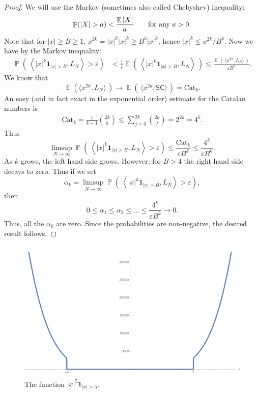\documentclass[letterpaper,11pt,oneside,reqno]{amsart}
\numberwithin{equation}{section}
\newcommand{\SC}{\mathsf{SC}}
\DeclareMathOperator{\EE}{\mathbb{E}}
\DeclareMathOperator{\PP}{\mathbb{P}}
\theoremstyle{definition}
\begin{document}
\begin{proof}
	We will use the Markov (sometimes also called Chebyshev) inequality:
	\begin{equation*}
	\PP (  | X | > a ) < \frac{ \EE | X |  }{ a }\qquad \textnormal{for any $a>0$}.
	\end{equation*}
	Note that for $ | x | \ge B \ge 1 $,
	$x^{2k}=|x|^{k}|x|^{k}\ge B^{k}|x|^{k}$, hence
	$ | x |^k \le x^{ 2 k } / B^k $.  Now we have by the Markov inequality:
	\begin{align*}
	\PP \left( \, \left \langle | x |^k \mathbf{1}_{ | x | > B } , L_N \right \rangle > \varepsilon \right) &< \frac{ 1 }{ \varepsilon } \EE \left( \, \left \langle | x |^k \mathbf{1}_{ | x | > B } , L_N \right \rangle \, \right) \le \frac{ \EE \left( \, \langle x^{ 2k } , L_N \rangle \, \right) }{ \varepsilon B^k }.
	\end{align*}
	We know that
	\begin{equation*}
	\EE \left( \langle x^{2k} , L_N \rangle \, \right) \to \EE \left( \, \langle x^{ 2k } , \SC \rangle \, \right) = \mathrm{Cat}_k.
	\end{equation*}
	An easy (and in fact exact in the exponential order) 
	estimate for the Catalan numbers is
	\begin{align*}
	\mathrm{Cat}_k=\frac{1}{k+1}\binom{2k}{k} \le \sum_{ j = 0 }^{ 2k } \binom{2k}{j} = 2^{2k} = 4^k.
	\end{align*}
	Thus
	\begin{equation*}
	\limsup_{ N \to \infty } \PP \left( \, \left \langle | x |^k \mathbf{1}_{ | x | > B } , L_N \right \rangle > \varepsilon \right) \le \frac{ \mathrm{Cat}_k }{ \varepsilon B^k } \le \frac{ 4^k }{ \varepsilon B^k }.
	\end{equation*}
	As $ k $ grows, the left hand side grows. However, for $ B > 4 $ the right hand side decays to zero. Thus if we set
	\begin{equation*}
	\alpha_k = \limsup_{ N \to \infty } \PP \left( \, \left \langle | x |^k \mathbf{1}_{ | x | > B } , L_N \right \rangle > \varepsilon \right),
	\end{equation*}
	then
	$$
	0 \le \alpha_1 \le \alpha_2 \le \ldots \le \frac{ 4^k }{ \varepsilon B^k } \to 0.
	$$
	Thus, all the $ \alpha_k $ are zero. Since the probabilities are non-negative, the desired result follows.
\end{proof}
\begin{figure}[htbp]
	\includegraphics[width=.6\textwidth]{img/indicator_polynomial.png}
	\caption{The function $|x|^{5}\mathbf{1}_{|x|>5}$.}
	\label{fig:indicator_polynomial}
\end{figure}
\end{document}
